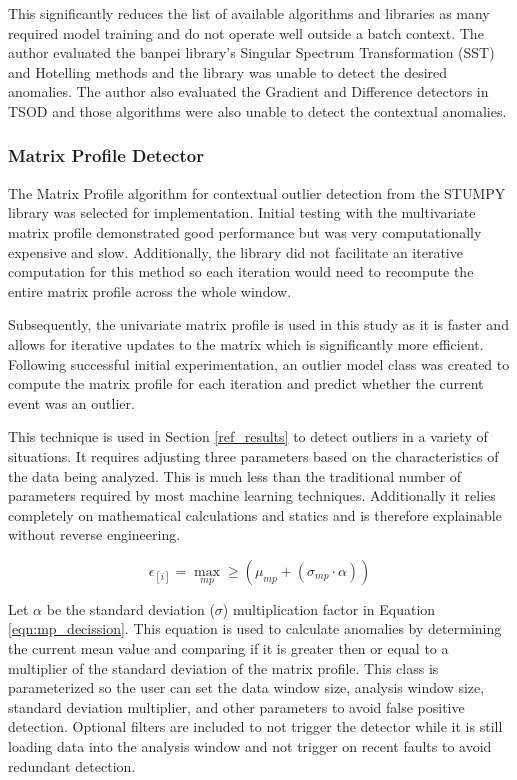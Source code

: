 This significantly reduces the list of available algorithms and libraries as many required model training and do not operate well outside a batch context. The author evaluated the banpei \parencite{banpei} library's Singular Spectrum Transformation (SST) and Hotelling methods and the library was unable to detect the desired anomalies. The author also evaluated the Gradient and Difference detectors in TSOD \parencite{tsod} and those algorithms were also unable to detect the contextual anomalies.

\subsubsection{Matrix Profile Detector}

The Matrix Profile algorithm for contextual outlier detection from the STUMPY library \parencite{law2019stumpy} was selected for implementation. Initial testing with the multivariate matrix profile demonstrated good performance but was very computationally expensive and slow. Additionally, the library did not facilitate an iterative computation for this method so each iteration would need to recompute the entire matrix profile across the whole window.

Subsequently, the univariate matrix profile is used in this study as it is faster and allows for iterative updates to the matrix which is significantly more efficient. Following successful initial experimentation, an outlier model class was created to compute the matrix profile for each iteration and predict whether the current event was an outlier.

This technique is used in Section \ref{ref_results} to detect outliers in a variety of situations. It requires adjusting three parameters based on the characteristics of the data being analyzed. This is much less than the traditional number of parameters required by most machine learning techniques. Additionally it relies completely on mathematical calculations and statics and is therefore explainable without reverse engineering.

\begin{equation}
    \label{eqn:mp_decission}
    \epsilon_{[i]} = \max_{mp} \geq \left(\mu_{mp} + \left(\sigma_{mp} \cdot \alpha\right)\right)
\end{equation}


Let $ \alpha$ be the standard deviation ($\sigma$) multiplication factor in Equation \eqref{eqn:mp_decission}. This equation is used to calculate anomalies by determining the current mean value and comparing if it is greater then or equal to a multiplier of the standard deviation of the matrix profile. This class is parameterized so the user can set the data window size, analysis window size, standard deviation multiplier, and other parameters to avoid false positive detection. Optional filters are included to not trigger the detector while it is still loading data into the analysis window and not trigger on recent faults to avoid redundant detection.

